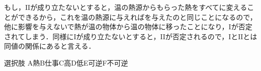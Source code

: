 \hspace{1zw}もし，$\mathrm{I\!I}$が成り立たないとすると，温の熱源からもらった熱をすべてに変えることができるから，これを温の熱源に与えればを与えたのと同じことになるので，他に影響を与えないで熱が温の物体から温の物体に移ったことになり，$\mathrm{I}$が否定されてしまう．同様に$\mathrm{I}$が成り立たないとすると，$\mathrm{I\!I}$が否定されるので，$\mathrm{I}$と$\mathrm{I\!I}$とは同値の関係にあると言える．

\begin{bsWaku}{選択肢}
\noindent\hspace*{1zw}A\hspace{1zw}熱\hfill B\hspace{1zw}仕事\hfill C\hspace{1zw}高\hfill D\hspace{1zw}低\hfill E\hspace{1zw}可逆\hfill F\hspace{1zw}不可逆\hspace*{1zw}
\end{bsWaku}

\newpage



